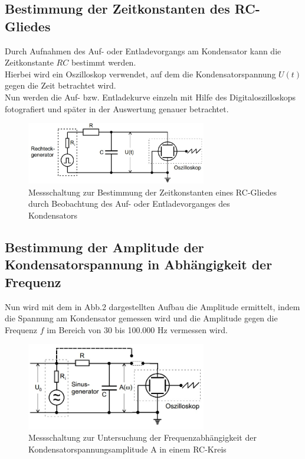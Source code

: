 \subsection{Bestimmung der Zeitkonstanten des RC-Gliedes}
Durch Aufnahmen des Auf- oder Entladevorgangs am Kondensator kann
die Zeitkonstante $RC$ bestimmt werden.\\
Hierbei wird ein Oszilloskop verwendet, auf dem die Kondensatorspannung $U(t)$ gegen die Zeit betrachtet wird. \\
Nun werden die Auf- bzw. Entladekurve einzeln mit Hilfe des Digitaloszilloskops fotografiert und später in der Auswertung genauer betrachtet.
\begin{figure}[h]
  \centering
  \includegraphics[width=0.7\textwidth]{Grafiken/V353_Abb1.jpg}
  \caption{Messschaltung zur Bestimmung der Zeitkonstanten eines RC-Gliedes durch Beobachtung des 
  Auf- oder Entladevorganges des Kondensators }
  \label{fig:V353_Abb1}
\end{figure}
\subsection{Bestimmung der Amplitude der Kondensatorspannung in Abhängigkeit der Frequenz}

Nun wird mit dem in Abb.2 dargestellten Aufbau die Amplitude ermittelt, indem die Spannung am Kondensator gemessen wird und die Amplitude gegen die Frequenz $f$ im Bereich von 30 bis 100.000 Hz vermessen wird.

\begin{figure}[h]
  \centering
  \includegraphics[width=0.7\textwidth]{Grafiken/V353_Abb2.jpg}
  \caption{Messschaltung zur Untersuchung der Frequenzabhängigkeit der Kondensatorspannungsamplitude A in einem RC-Kreis}
  \label{fig:V353_Abb2}
\end{figure}
